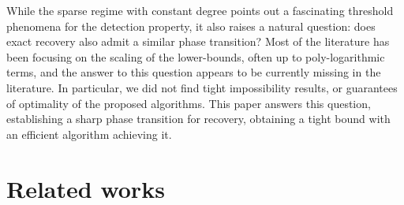 \documentclass[english]{article}
\newcommand{\1}{\textbf{1}}
\begin{document}
While the sparse regime with constant degree points out a fascinating threshold phenomena for the detection property, it  also raises a natural question: does exact recovery also admit a similar phase transition? Most of the literature has been focusing on the scaling of the lower-bounds, often up to poly-logarithmic terms, and the answer to this question appears to be currently missing in the literature. In particular, we did not find tight impossibility results, or guarantees of optimality of the proposed algorithms. This paper answers this question, establishing a sharp phase transition for recovery, obtaining a tight bound with an efficient algorithm achieving it. 





\section{Related works}\label{related}
\end{document}
